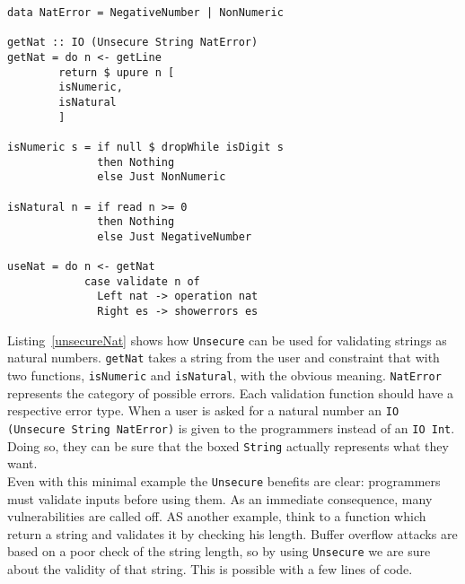 \begin{lstlisting}[label={unsecureNat}, frame=single, breaklines=true, caption={Unsecure for natural numbers}]
data NatError = NegativeNumber | NonNumeric

getNat :: IO (Unsecure String NatError)
getNat = do n <- getLine
	    return $ upure n [
		isNumeric,
		isNatural
	    ]	   
	    
isNumeric s = if null $ dropWhile isDigit s
              then Nothing
              else Just NonNumeric

isNatural n = if read n >= 0
              then Nothing
              else Just NegativeNumber
              
useNat = do n <- getNat
            case validate n of
              Left nat -> operation nat
              Right es -> showerrors es
\end{lstlisting}
Listing~\ref{unsecureNat} shows how \texttt{Unsecure} can be used for validating strings as natural numbers. \texttt{getNat} takes a string from the user and constraint that with two functions, \texttt{isNumeric} and \texttt{isNatural}, with the obvious meaning. \texttt{NatError} represents the category of possible errors. Each validation function should have a respective error type. When a user is asked for a natural number an \texttt{IO (Unsecure String NatError)} is given to the programmers instead of an \texttt{IO Int}. Doing so, they can be sure that the boxed \texttt{String} actually represents what they want. \\
Even with this minimal example the \texttt{Unsecure} benefits are clear: programmers must validate inputs before using them. As an immediate consequence, many vulnerabilities are called off. AS another example, think to a function which return a string and validates it by checking his length. Buffer overflow attacks are based on a poor check of the string length, so by using \texttt{Unsecure} we are sure about the validity of that string. This is possible with a few lines of code. 
